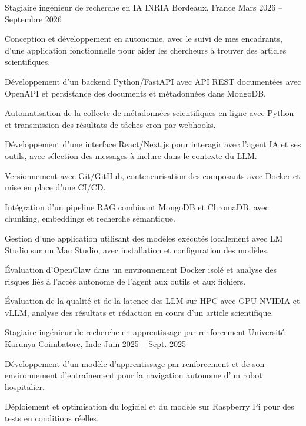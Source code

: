 
\begin{cventries}
  \cventry
    {Stagiaire ingénieur de recherche en IA}
    {INRIA}
    {Bordeaux, France}
    {Mars 2026 -- Septembre 2026}
    {
      \begin{cvitems}
        \item {Conception et développement en autonomie, avec le suivi de mes encadrants, d’une application fonctionnelle pour aider les chercheurs à trouver des articles scientifiques.}
        \item {Développement d’un backend Python/FastAPI avec API REST documentées avec OpenAPI et persistance des documents et métadonnées dans MongoDB.}
        \item {Automatisation de la collecte de métadonnées scientifiques en ligne avec Python et transmission des résultats de tâches cron par webhooks.}
        \item {Développement d’une interface React/Next.js pour interagir avec l’agent IA et ses outils, avec sélection des messages à inclure dans le contexte du LLM.}
        \item {Versionnement avec Git/GitHub, conteneurisation des composants avec Docker et mise en place d’une CI/CD.}
        \item {Intégration d’un pipeline RAG combinant MongoDB et ChromaDB, avec chunking, embeddings et recherche sémantique.}
        \item {Gestion d’une application utilisant des modèles exécutés localement avec LM Studio sur un Mac Studio, avec installation et configuration des modèles.}
        \item {Évaluation d’OpenClaw dans un environnement Docker isolé et analyse des risques liés à l’accès autonome de l’agent aux outils et aux fichiers.}
        \item {Évaluation de la qualité et de la latence des LLM sur HPC avec GPU NVIDIA et vLLM, analyse des résultats et rédaction en cours d’un article scientifique.}
      \end{cvitems}
    }

  \cventry
    {Stagiaire ingénieur de recherche en apprentissage par renforcement}
    {Université Karunya}
    {Coimbatore, Inde}
    {Juin 2025 -- Sept. 2025}
    {
      \begin{cvitems}
        \item {Développement d’un modèle d’apprentissage par renforcement et de son environnement d’entraînement pour la navigation autonome d’un robot hospitalier.}
        \item {Déploiement et optimisation du logiciel et du modèle sur Raspberry Pi pour des tests en conditions réelles.}
      \end{cvitems}
    }
\end{cventries}
